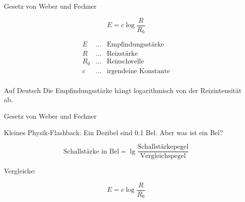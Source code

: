 \documentclass[aspectratio=169]{beamer}
\begin{document}
\begin{frame}{Gesetz von Weber und Fechner}

\[
E = c\log \frac{R}{R_0}
\]


\[
\begin{array}{lll}
E           &\ldots    & \text{Empfindungsstärke} \\
R           & \ldots    & \text{Reizstärke} \\
R_0           & \ldots    & \text{Reizschwelle} \\
c           & \ldots    & \text{irgendeine Konstante} \\
\end{array}
\]

\begin{block}{Auf Deutsch}
Die Empfindungsstärke hängt logarithmisch von der Reizintensität ab.
\end{block}

 
\end{frame}




\begin{frame}{Gesetz von Weber und Fechner}

Kleines Physik-Flashback: Ein Dezibel sind 0.1 Bel. Aber was ist ein Bel? 

\pause

\[
\text{Schallstärke in Bel} = \lg \frac{\text{Schallstärkepegel}}{\text{Vergleichspegel}} 
\]

\pause

Vergleiche: 

\[
E = c\log \frac{R}{R_0}
\]


    
\end{frame}



\end{document}
